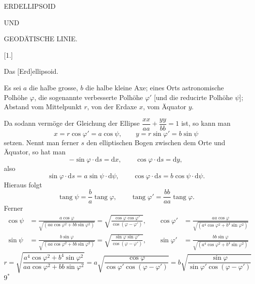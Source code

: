 \clearpage
\vspace*{45mm}
\begin{center}
{\Huge ERDELLIPSOID}\par\vspace{10mm}
{\large UND}\par\vspace{10mm}
{\Huge GEODÄTISCHE LINIE.}
\end{center}
\clearpage
\null
\clearpage
\begin{center}
{\Large{}}\par\vspace{12mm}
[1.]\par
Das [Erd]ellipsoid.
\end{center}
Es sei $a$ die halbe grosse, $b$ die halbe kleine Axe; eines Orts astronomische Polhöhe $\varphi$, die sogenannte verbesserte Polhöhe $\varphi'$ [und die reducirte Polhöhe $\psi$]; Abstand vom Mittelpunkt $r$, von der Erdaxe $x$, vom Äquator $y$.

Da sodann vermöge der Gleichung der Ellipse $\dfrac{xx}{aa}+\dfrac{yy}{bb}=1$ ist, so kann man
\[
x=r\cos\varphi'=a\cos\psi,\qquad y=r\sin\varphi'=b\sin\psi
\]
setzen. Nennt man ferner $s$ den elliptischen Bogen zwischen dem Orte und Äquator, so hat man
\[
-\sin\varphi\cdot\mathrm ds=\mathrm dx,\qquad\cos\varphi\cdot\mathrm ds=\mathrm dy,
\]
also
\[
\sin\varphi\cdot\mathrm ds=a\sin\psi\cdot\mathrm d\psi,\qquad\cos\varphi\cdot\mathrm ds=b\cos\psi\cdot\mathrm d\psi.
\]
Hieraus folgt
\[
\operatorname{tang}\psi=\frac ba\operatorname{tang}\varphi,\qquad\operatorname{tang}\varphi'=\frac{bb}{aa}\operatorname{tang}\varphi.
\]
Ferner
\[
\begin{aligned}
\cos\psi&=\frac{a\cos\varphi}{\sqrt{(aa\cos\varphi^2+bb\sin\varphi^2)}}=\sqrt{\frac{\cos\varphi\cos\varphi'}{\cos(\varphi-\varphi')}},\quad&\cos\varphi'&=\frac{aa\cos\varphi}{\sqrt{(a^4\cos\varphi^2+b^4\sin\varphi^2)}}\\
\sin\psi&=\frac{b\sin\varphi}{\sqrt{(aa\cos\varphi^2+bb\sin\varphi^2)}}=\sqrt{\frac{\sin\varphi\sin\varphi'}{\cos(\varphi-\varphi')}},&\sin\varphi'&=\frac{bb\sin\varphi}{\sqrt{(a^4\cos\varphi^2+b^4\sin\varphi^2)}}
\end{aligned}
\]
\[
r=\sqrt{\frac{a^4\cos\varphi^2+b^4\sin\varphi^2}{aa\cos\varphi^2+bb\sin\varphi^2}}=a\sqrt{\frac{\cos\varphi}{\cos\varphi'\cos(\varphi-\varphi')}}=b\sqrt{\frac{\sin\varphi}{\sin\varphi'\cos(\varphi-\varphi')}}
\]
\noindent\hfill $9^*$\par

